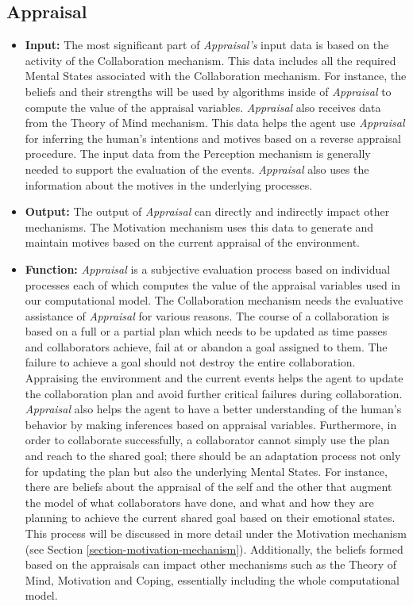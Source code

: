 \documentclass[12pt]{report}
\begin{document}
\subsection{Appraisal}

\begin{itemize}
  \item \textbf{Input:} The most significant part of \textit{Appraisal's} input
  data is based on the activity of the Collaboration mechanism. This data
  includes all the required Mental States associated with the Collaboration
  mechanism. For instance, the beliefs and their strengths will be used by
  algorithms inside of \textit{Appraisal} to compute the value of the appraisal
  variables. \textit{Appraisal} also receives data from the Theory of Mind
  mechanism. This data helps the agent use \textit{Appraisal} for inferring
  the human's intentions and motives based on a reverse appraisal procedure.
  The input data from the Perception mechanism is generally needed to support
  the evaluation of the events. \textit{Appraisal} also uses the information
  about the motives in the underlying processes.
   
  \item \textbf{Output:} The output of \textit{Appraisal} can directly and
  indirectly impact other mechanisms. The Motivation mechanism uses this data to
  generate and maintain motives based on the current appraisal of the
  environment.
  
  \item \textbf{Function:} \textit{Appraisal} is a subjective evaluation process
  based on individual processes each of which computes the value of the
  appraisal variables used in our computational model. The Collaboration
  mechanism needs the evaluative assistance of \textit{Appraisal} for various
  reasons. The course of a collaboration is based on a full or a partial plan
  which needs to be updated as time passes and collaborators achieve, fail at or
  abandon a goal assigned to them. The failure to achieve a goal should not
  destroy the entire collaboration. Appraising the environment and the current
  events helps the agent to update the collaboration plan and avoid further
  critical failures during collaboration.  \textit{Appraisal} also helps the
  agent to have a better understanding of the human's behavior by making
  inferences based on appraisal variables. Furthermore, in order to collaborate
  successfully, a collaborator cannot simply use the plan and reach to the
  shared goal; there should be an adaptation process not only for updating the
  plan but also the underlying Mental States. For instance, there are beliefs
  about the appraisal of the self and the other that augment the model of what
  collaborators have done, and what and how they are planning to achieve the
  current shared goal based on their emotional states. This process will be
  discussed in more detail under the Motivation mechanism (see Section
  \ref{section-motivation-mechanism}). Additionally, the beliefs formed based on
  the appraisals can impact other mechanisms such as the Theory of Mind,
  Motivation and Coping, essentially including the whole computational model.
\end{itemize}
\end{document}
